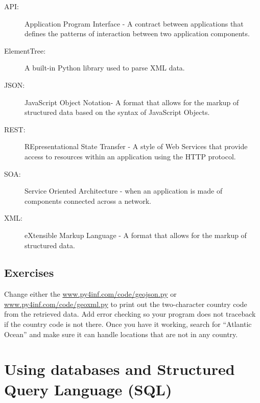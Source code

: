 \documentclass[11pt]{book}
\begin{document}
\begin{description}

\item[API:] Application Program Interface - A contract between
applications that defines the patterns of interaction between 
two application components.

\item[ElementTree:] A built-in Python library used to parse XML data.

\item[JSON:] JavaScript Object Notation- A format that allows for 
the markup of structured data based on the syntax of JavaScript
Objects.

\item[REST:] REpresentational State Transfer - A style of Web Services 
that provide access to resources within an application using the HTTP
protocol.

\item[SOA:] Service Oriented Architecture - when an application is 
made of components connected across a network.

\item[XML:] eXtensible Markup Language - A format that allows for 
the markup of structured data.

\end{description}

\section{Exercises}

\begin{ex}
Change either the 
\url{www.py4inf.com/code/geojson.py} or
\url{www.py4inf.com/code/geoxml.py} to print out the 
two-character country code from the retrieved data.
Add error checking so your program does not traceback
if the country code is not there.  Once you have it 
working, search for ``Atlantic Ocean'' and make sure
it can handle locations that are not in any country.
\end{ex}

\chapter{Using databases and Structured Query Language (SQL)}
\end{document}
